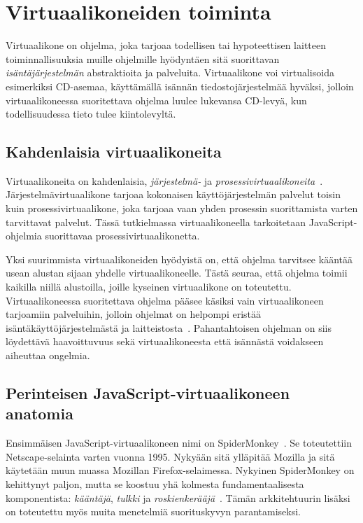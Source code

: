 \section{Virtuaalikoneiden toiminta}

Virtuaalikone on ohjelma, joka tarjoaa todellisen tai hypoteettisen laitteen toiminnallisuuksia muille ohjelmille hyödyntäen sitä suorittavan \textit{isäntäjärjestelmän} abstraktioita ja palveluita. Virtuaalikone voi virtualisoida esimerkiksi CD-asemaa, käyttämällä isännän tiedostojärjestelmää hyväksi, jolloin virtuaalikoneessa suoritettava ohjelma luulee lukevansa CD-levyä, kun todellisuudessa tieto tulee kiintolevyltä.

\pagebreak
\subsection{Kahdenlaisia virtuaalikoneita}

Virtuaalikoneita on kahdenlaisia, \textit{järjestelmä-} ja \textit{prosessivirtuaalikoneita}~\cite[s.~33]{vms}. Järjestelmävirtuaalikone tarjoaa kokonaisen käyttöjärjestelmän palvelut toisin kuin prosessivirtuaalikone, joka tarjoaa vaan yhden prosessin suorittamista varten tarvittavat palvelut. Tässä tutkielmassa virtuaalikoneella tarkoitetaan JavaScript-ohjelmia suorittavaa prosessivirtuaalikonetta.

Yksi suurimmista virtuaalikoneiden hyödyistä on, että ohjelma tarvitsee kääntää usean alustan sijaan yhdelle virtuaalikoneelle. Tästä seuraa, että ohjelma toimii kaikilla niillä alustoilla, joille kyseinen virtuaalikone on toteutettu. Virtuaalikoneessa suoritettava ohjelma pääsee käsiksi vain virtuaalikoneen tarjoamiin palveluihin, jolloin ohjelmat on helpompi eristää isäntäkäyttöjärjestelmästä ja laitteistosta~\cite[s.~36]{vms}. Pahantahtoisen ohjelman on siis löydettävä haavoittuvuus sekä virtuaalikoneesta että isännästä voidakseen aiheuttaa ongelmia.

\subsection{Perinteisen JavaScript-virtuaalikoneen anatomia}

Ensimmäisen JavaScript-virtuaalikoneen nimi on SpiderMonkey~\cite{spidermonkey}. Se toteutettiin Netscape-selainta varten vuonna 1995. Nykyään sitä ylläpitää Mozilla ja sitä käytetään muun muassa Mozillan Firefox-selaimessa. Nykyinen SpiderMonkey on kehittynyt paljon, mutta se koostuu yhä kolmesta fundamentaalisesta komponentista: \textit{kääntäjä}, \textit{tulkki} ja \textit{roskienkerääjä}~\cite{spidermonkeydesign}. Tämän arkkitehtuurin lisäksi on toteutettu myös muita menetelmiä suorituskyvyn parantamiseksi.

